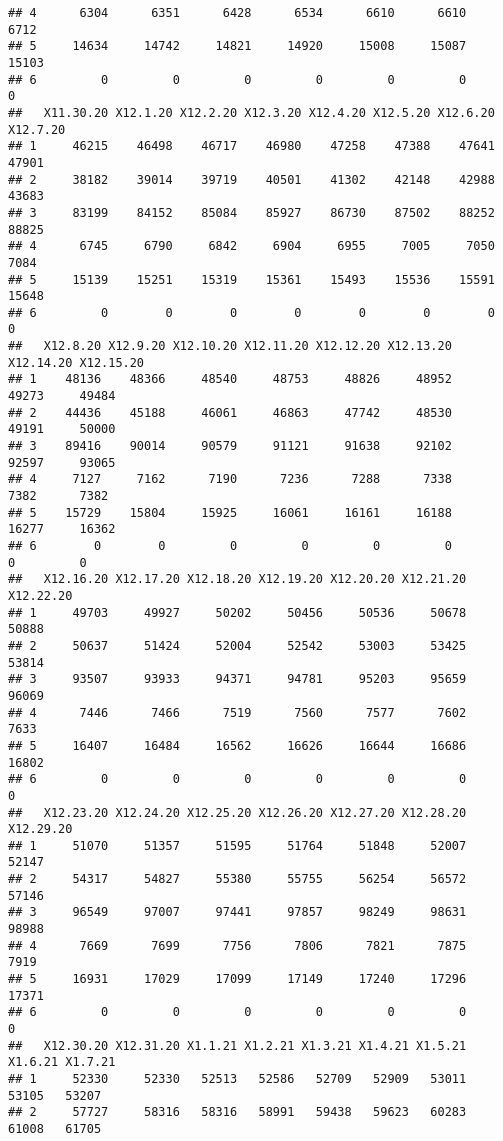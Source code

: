 \documentclass[
]{article}
\begin{document}
\begin{verbatim}
## 4      6304      6351      6428      6534      6610      6610      6712
## 5     14634     14742     14821     14920     15008     15087     15103
## 6         0         0         0         0         0         0         0
##   X11.30.20 X12.1.20 X12.2.20 X12.3.20 X12.4.20 X12.5.20 X12.6.20 X12.7.20
## 1     46215    46498    46717    46980    47258    47388    47641    47901
## 2     38182    39014    39719    40501    41302    42148    42988    43683
## 3     83199    84152    85084    85927    86730    87502    88252    88825
## 4      6745     6790     6842     6904     6955     7005     7050     7084
## 5     15139    15251    15319    15361    15493    15536    15591    15648
## 6         0        0        0        0        0        0        0        0
##   X12.8.20 X12.9.20 X12.10.20 X12.11.20 X12.12.20 X12.13.20 X12.14.20 X12.15.20
## 1    48136    48366     48540     48753     48826     48952     49273     49484
## 2    44436    45188     46061     46863     47742     48530     49191     50000
## 3    89416    90014     90579     91121     91638     92102     92597     93065
## 4     7127     7162      7190      7236      7288      7338      7382      7382
## 5    15729    15804     15925     16061     16161     16188     16277     16362
## 6        0        0         0         0         0         0         0         0
##   X12.16.20 X12.17.20 X12.18.20 X12.19.20 X12.20.20 X12.21.20 X12.22.20
## 1     49703     49927     50202     50456     50536     50678     50888
## 2     50637     51424     52004     52542     53003     53425     53814
## 3     93507     93933     94371     94781     95203     95659     96069
## 4      7446      7466      7519      7560      7577      7602      7633
## 5     16407     16484     16562     16626     16644     16686     16802
## 6         0         0         0         0         0         0         0
##   X12.23.20 X12.24.20 X12.25.20 X12.26.20 X12.27.20 X12.28.20 X12.29.20
## 1     51070     51357     51595     51764     51848     52007     52147
## 2     54317     54827     55380     55755     56254     56572     57146
## 3     96549     97007     97441     97857     98249     98631     98988
## 4      7669      7699      7756      7806      7821      7875      7919
## 5     16931     17029     17099     17149     17240     17296     17371
## 6         0         0         0         0         0         0         0
##   X12.30.20 X12.31.20 X1.1.21 X1.2.21 X1.3.21 X1.4.21 X1.5.21 X1.6.21 X1.7.21
## 1     52330     52330   52513   52586   52709   52909   53011   53105   53207
## 2     57727     58316   58316   58991   59438   59623   60283   61008   61705

\end{verbatim}
\end{document}
